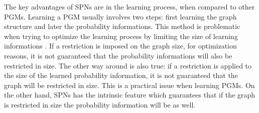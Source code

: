 The key advantages of SPNs are in the learning process, when compared to other PGMs.
Learning a PGM usually involves two steps: first learning the graph structure and later the probability informations.
This method is problematic when trying to optimize the learning process by limiting the size of learning informations \cite{Zhao2015}.
If a restriction is imposed on the graph size, for optimization reasons, it is not guaranteed that the probability informations will also be restricted in size.
The other way around is also true: if a restriction is applied to the size of the learned probability information, it is not guaranteed that the graph will be restricted in size.
This is a practical issue when learning PGMs.
On the other hand, SPNs has the intrinsic feature which guarantees that if the graph is restricted in size the probability information will be as well.